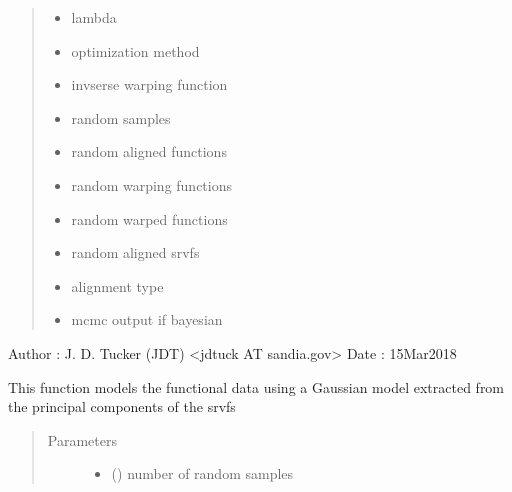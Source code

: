 \documentclass[letterpaper,10pt,english]{sphinxmanual}
\begin{document}
\begin{fulllineitems}
\begin{quote}
\begin{description}
\begin{itemize}
\item {} 
 \textendash{} lambda

\item {} 
 \textendash{} optimization method

\item {} 
 \textendash{} invserse warping function

\item {} 
 \textendash{} random samples

\item {} 
 \textendash{} random aligned functions

\item {} 
 \textendash{} random warping functions

\item {} 
 \textendash{} random warped functions

\item {} 
 \textendash{} random aligned srvfs

\item {} 
 \textendash{} alignment type

\item {} 
 \textendash{} mcmc output if bayesian

\end{itemize}

\end{description}\end{quote}

Author :  J. D. Tucker (JDT) \textless{}jdtuck AT sandia.gov\textgreater{}
Date   :  15\sphinxhyphen{}Mar\sphinxhyphen{}2018

\begin{fulllineitems}
\label{\detokenize{time_warping:time_warping.fdawarp.gauss_model}}
This function models the functional data using a Gaussian model
extracted from the principal components of the srvfs
\begin{quote}\begin{description}
\item[{Parameters}] \leavevmode\begin{itemize}
\item {} 
 () \textendash{} number of random samples


\end{itemize}
\end{description}
\end{quote}
\end{fulllineitems}
\end{fulllineitems}
\end{document}
